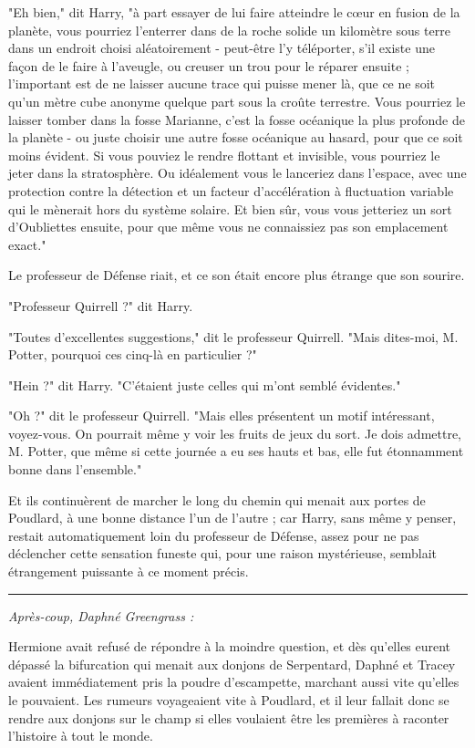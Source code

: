 "Eh bien," dit Harry, "à part essayer de lui faire atteindre le cœur en fusion de la planète, vous pourriez l'enterrer dans de la roche solide un kilomètre sous terre dans un endroit choisi aléatoirement - peut-être l'y téléporter, s'il existe une façon de le faire à l'aveugle, ou creuser un trou pour le réparer ensuite ; l'important est de ne laisser aucune trace qui puisse mener là, que ce ne soit qu'un mètre cube anonyme quelque part sous la croûte terrestre. Vous pourriez le laisser tomber dans la fosse Marianne, c'est la fosse océanique la plus profonde de la planète - ou juste choisir une autre fosse océanique au hasard, pour que ce soit moins évident. Si vous pouviez le rendre flottant et invisible, vous pourriez le jeter dans la stratosphère. Ou idéalement vous le lanceriez dans l'espace, avec une protection contre la détection et un facteur d'accélération à fluctuation variable qui le mènerait hors du système solaire. Et bien sûr, vous vous jetteriez un sort d'Oubliettes ensuite, pour que même vous ne connaissiez pas son emplacement exact."

Le professeur de Défense riait, et ce son était encore plus étrange que son sourire.

"Professeur Quirrell ?" dit Harry.

"Toutes d'excellentes suggestions," dit le professeur Quirrell. "Mais dites-moi, M. Potter, pourquoi ces cinq-là en particulier ?"

"Hein ?" dit Harry. "C'étaient juste celles qui m'ont semblé évidentes."

"Oh ?" dit le professeur Quirrell. "Mais elles présentent un motif intéressant, voyez-vous. On pourrait même y voir les fruits de jeux du sort. Je dois admettre, M. Potter, que même si cette journée a eu ses hauts et bas, elle fut étonnamment bonne dans l'ensemble."

Et ils continuèrent de marcher le long du chemin qui menait aux portes de Poudlard, à une bonne distance l'un de l'autre ; car Harry, sans même y penser, restait automatiquement loin du professeur de Défense, assez pour ne pas déclencher cette sensation funeste qui, pour une raison mystérieuse, semblait étrangement puissante à ce moment précis.
\par\noindent\rule{\textwidth}{0.4pt}
\emph{Après-coup, Daphné Greengrass :} 

Hermione avait refusé de répondre à la moindre question, et dès qu'elles eurent dépassé la bifurcation qui menait aux donjons de Serpentard, Daphné et Tracey avaient immédiatement pris la poudre d'escampette, marchant aussi vite qu'elles le pouvaient. Les rumeurs voyageaient vite à Poudlard, et il leur fallait donc se rendre aux donjons sur le champ si elles voulaient être les premières à raconter l'histoire à tout le monde.

